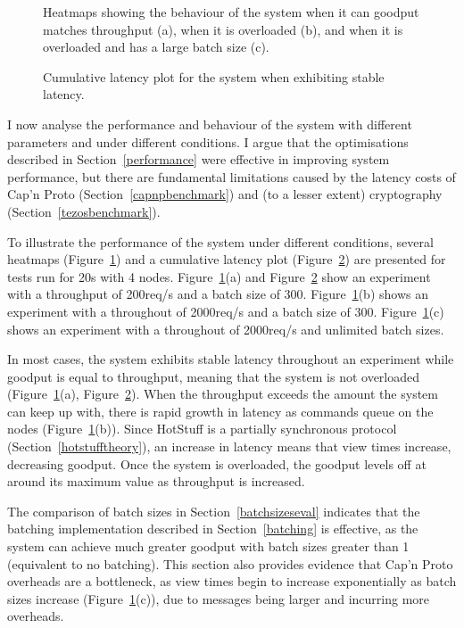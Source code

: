 \begin{figure}[h]
\centering
\resizebox{.8\textwidth}{!}{}
\caption{Heatmaps showing the behaviour of the system when it can goodput matches throughput (a), when it is overloaded (b), and when it is overloaded and has a large batch size (c).}
\label{heatmaps}
\end{figure}

\begin{figure}[h]
\centering
\resizebox{.6\textwidth}{!}{}
\caption{Cumulative latency plot for the system when exhibiting stable latency.}
\label{ecdfstable}
\end{figure}

I now analyse the performance and behaviour of the system with different parameters and under different conditions. I argue that the optimisations described in Section~\ref{performance} were effective in improving system performance, but there are fundamental limitations caused by the latency costs of Cap'n Proto (Section~\ref{capnpbenchmark}) and (to a lesser extent) cryptography (Section~\ref{tezosbenchmark}).

To illustrate the performance of the system under different conditions, several heatmaps (Figure~\ref{heatmaps}) and a cumulative latency plot (Figure~\ref{ecdfstable}) are presented for tests run for 20s with 4 nodes. Figure~\ref{heatmaps}(a) and Figure~\ref{ecdfstable} show an experiment with a throughput of 200req/s and a batch size of 300. Figure~\ref{heatmaps}(b) shows an experiment with a throughout of 2000req/s and a batch size of 300. Figure~\ref{heatmaps}(c) shows an experiment with a throughout of 2000req/s and unlimited batch sizes.

In most cases, the system exhibits stable latency throughout an experiment while goodput is equal to throughput, meaning that the system is not overloaded (Figure~\ref{heatmaps}(a), Figure~\ref{ecdfstable}). When the throughput exceeds the amount the system can keep up with, there is rapid growth in latency as commands queue on the nodes (Figure~\ref{heatmaps}(b)). Since HotStuff is a partially synchronous protocol (Section~\ref{hotstufftheory}), an increase in latency means that view times increase, decreasing goodput. Once the system is overloaded, the goodput levels off at around its maximum value as throughput is increased.

The comparison of batch sizes in Section~\ref{batchsizeseval} indicates that the batching implementation described in Section~\ref{batching} is effective, as the system can achieve much greater goodput with batch sizes greater than 1 (equivalent to no batching). This section also provides evidence that Cap'n Proto overheads are a bottleneck, as view times begin to increase exponentially as batch sizes increase (Figure~\ref{heatmaps}(c)), due to messages being larger and incurring more overheads.

